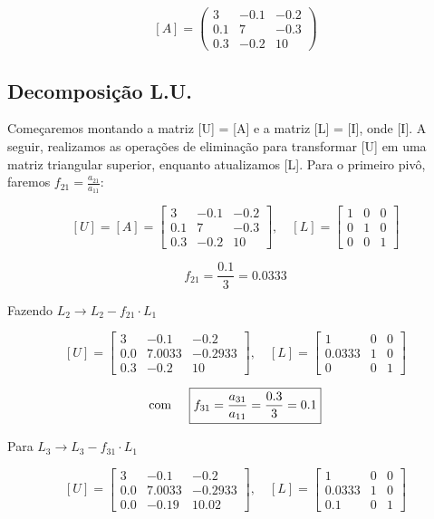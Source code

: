 \documentclass[12pt]{article}
\begin{document}
\[
  [A] = \begin{pmatrix}

    3 & -0.1 & -0.2 \\
    0.1 & 7 & -0.3 \\
    0.3 & -0.2 & 10
  \end{pmatrix}
\]

\subsection{Decomposição L.U.}
Começaremos montando a matriz [U] = [A] e a matriz [L] = [I], onde [I]. A seguir, realizamos as operações de eliminação para transformar [U] em uma matriz triangular superior, enquanto atualizamos [L]. Para o primeiro pivô, faremos \(f_{21}=\frac{a_{21}}{a_{11}}\):

\[
  [U] = [A] = \begin{bmatrix}
    3 & -0.1 & -0.2 \\
    0.1 & 7 & -0.3 \\
    0.3 & -0.2 & 10
  \end{bmatrix}, \quad
  [L] = \begin{bmatrix}
    1 & 0 & 0 \\
    0 & 1 & 0 \\
    0 & 0 & 1
  \end{bmatrix}
\]

\[
\boxed{f_{21} = \frac{0.1}{3} = 0.0333}
\]

Fazendo \(L_{2}\rightarrow L_{2} - f_{21} \cdot L_{1}\)


\[
  [U] = \begin{bmatrix}
    3 & -0.1 & -0.2 \\
    0.0 & 7.0033 & -0.2933 \\
    0.3 & -0.2 & 10
  \end{bmatrix}, \quad
  [L] = \begin{bmatrix}
    1 & 0 & 0 \\
    0.0333 & 1 & 0 \\
    0 & 0 & 1
  \end{bmatrix}
\]

\[
\text{com} \hspace{0.5cm} \boxed{f_{31} = \frac{a_{31}}{a_{11}} = \frac{0.3}{3} = 0.1}
\]

Para \(L_{3}\rightarrow L_{3} - f_{31} \cdot L_{1}\)

\[
  [U] = \begin{bmatrix}
    3 & -0.1 & -0.2 \\
    0.0 & 7.0033 & -0.2933 \\
    0.0 & -0.19 & 10.02
  \end{bmatrix}, \quad
  [L] = \begin{bmatrix}
    1 & 0 & 0 \\
    0.0333 & 1 & 0 \\
    0.1 & 0 & 1
  \end{bmatrix}
\]
\end{document}
